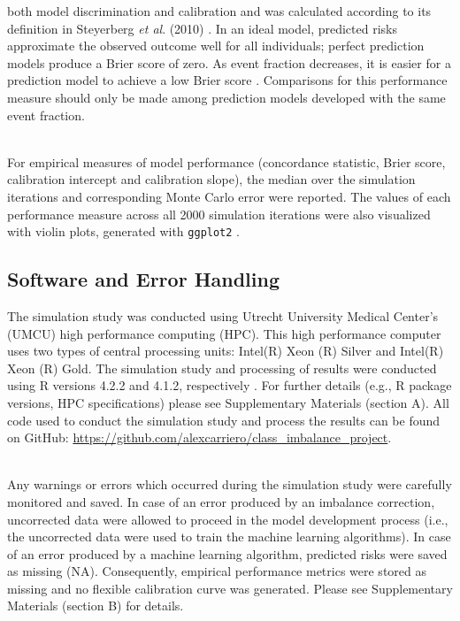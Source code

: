 \documentclass[AMA,STIX1COL,]{WileyNJD-v2}
\begin{document}
both model discrimination and calibration and was calculated according
to its definition in Steyerberg \emph{et al}. (2010) \citep{epi}. In an
ideal model, predicted risks approximate the observed outcome well for
all individuals; perfect prediction models produce a Brier score of
zero. As event fraction decreases, it is easier for a prediction model
to achieve a low Brier score \citep{epi}. Comparisons for this
performance measure should only be made among prediction models
developed with the same event fraction.\\
\strut \\
For empirical measures of model performance (concordance statistic,
Brier score, calibration intercept and calibration slope), the median
over the simulation iterations and corresponding Monte Carlo error were
reported. The values of each performance measure across all 2000
simulation iterations were also visualized with violin plots, generated
with \texttt{ggplot2} \citep{gg}.

\hypertarget{software-and-error-handling}{%
\subsection{Software and Error
Handling}\label{software-and-error-handling}}

\hfill\break
The simulation study was conducted using Utrecht University Medical
Center's (UMCU) high performance computing (HPC). This high performance
computer uses two types of central processing units: Intel(R) Xeon (R)
Silver and Intel(R) Xeon (R) Gold. The simulation study and processing
of results were conducted using R versions 4.2.2 and 4.1.2, respectively
\citep{r}. For further details (e.g., R package versions, HPC
specifications) please see Supplementary Materials (section A). All code
used to conduct the simulation study and process the results can be
found on GitHub:
\url{https://github.com/alexcarriero/class_imbalance_project}.\\
\strut \\
Any warnings or errors which occurred during the simulation study were
carefully monitored and saved. In case of an error produced by an
imbalance correction, uncorrected data were allowed to proceed in the
model development process (i.e., the uncorrected data were used to train
the machine learning algorithms). In case of an error produced by a
machine learning algorithm, predicted risks were saved as missing (NA).
Consequently, empirical performance metrics were stored as missing and
no flexible calibration curve was generated. Please see Supplementary
Materials (section B) for details.
\end{document}
